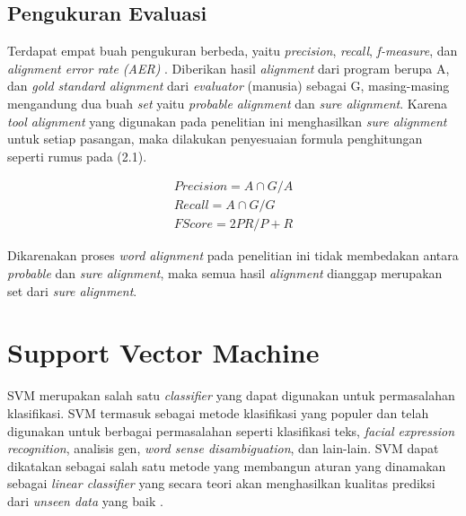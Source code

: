 \subsection{Pengukuran Evaluasi}
Terdapat empat buah pengukuran berbeda, yaitu \textit{precision}, \textit{recall}, \textit{f-measure}, dan \textit{alignment error rate (AER)} \citep{mihalcea2003evaluation}. Diberikan hasil \textit{alignment} dari program berupa A, dan \textit{gold standard alignment} dari \textit{evaluator} (manusia) sebagai G, masing-masing mengandung dua buah \textit{set} yaitu \textit{probable alignment} dan \textit{sure alignment}. Karena \textit{tool alignment} yang digunakan pada penelitian ini menghasilkan \textit{sure alignment} untuk setiap pasangan, maka dilakukan penyesuaian formula penghitungan seperti rumus pada (2.1).

\begin{equation}
	\begin{split}
	Precision = A \cap G / A \\
	Recall = A \cap G / G \\
	FScore = 2 P R / P + R
	\end{split}
\end{equation}

Dikarenakan proses \textit{word alignment} pada penelitian ini tidak membedakan antara \textit{probable} dan \textit{sure alignment}, maka semua hasil \textit{alignment} dianggap merupakan set dari \textit{sure alignment}.

\section{Support Vector Machine}
SVM merupakan salah satu \textit{classifier} yang dapat digunakan untuk permasalahan klasifikasi. SVM termasuk sebagai metode klasifikasi yang populer dan telah digunakan untuk berbagai permasalahan seperti klasifikasi teks, \textit{facial expression recognition}, analisis gen, \textit{word sense disambiguation}, dan lain-lain. SVM dapat dikatakan sebagai salah satu metode yang membangun aturan yang dinamakan sebagai \textit{linear classifier} yang secara teori akan menghasilkan kualitas prediksi dari \textit{unseen data} yang baik \citep{fradkin2006support}.

